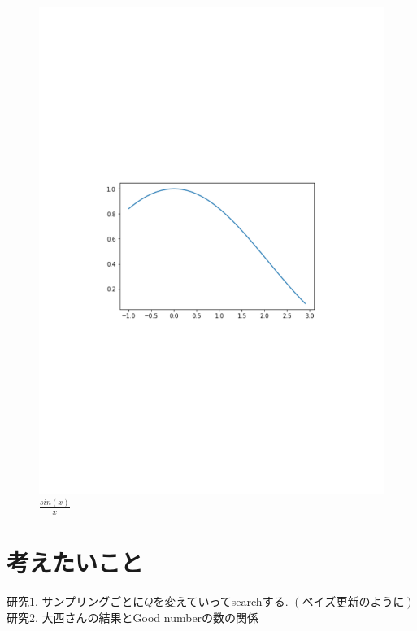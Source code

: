 \documentclass{jsarticle}
\theoremstyle{definition}
\begin{document}
\begin{figure}[h]
\begin{center}
\includegraphics[width=1.0\linewidth]{sin_x_ov_x.pdf}
\caption{$\frac{sin(x)}{x}$}
\end{center}
\end{figure}

\section{考えたいこと}
研究$1$. サンプリングごとに$Q$を変えていってsearchする. $(ベイズ更新のように)$\\
研究$2$. 大西さんの結果とGood numberの数の関係\\
\end{document}
